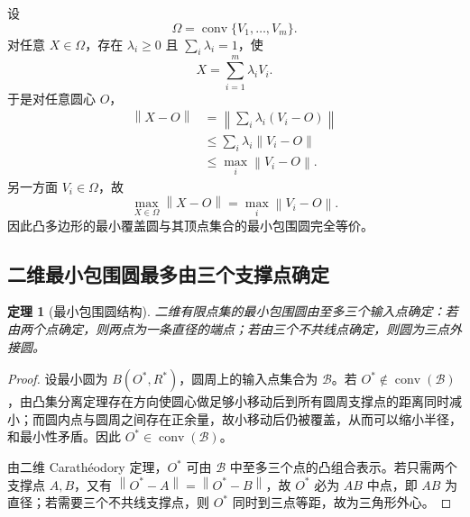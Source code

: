 \documentclass[UTF8,12pt,a4paper]{ctexart}
\newtheorem{theorem}{定理}[section]
\theoremstyle{definition}
\newcommand{\norm}[1]{\left\lVert #1\right\rVert}
\DeclareMathOperator{\conv}{conv}
\begin{document}
设
\begin{equation}
\Omega=\conv\{V_1,\ldots,V_m\}.
\end{equation}
对任意 $X\in\Omega$，存在 $\lambda_i\ge0$ 且 $\sum_i\lambda_i=1$，使
\[
X=\sum_{i=1}^{m}\lambda_iV_i.
\]
于是对任意圆心 $O$，
\begin{align}
\norm{X-O}
&=\norm{\sum_i\lambda_i(V_i-O)}\\
&\le\sum_i\lambda_i\norm{V_i-O}\\
&\le\max_i\norm{V_i-O}.
\end{align}
另一方面 $V_i\in\Omega$，故
\begin{equation}
\boxed{
\max_{X\in\Omega}\norm{X-O}
=
\max_i\norm{V_i-O}.
}
\label{eq:polygon-vertex-mec}
\end{equation}
因此凸多边形的最小覆盖圆与其顶点集合的最小包围圆完全等价。

\subsection{二维最小包围圆最多由三个支撑点确定}

\begin{theorem}[最小包围圆结构]
二维有限点集的最小包围圆由至多三个输入点确定：若由两个点确定，则两点为一条直径的端点；若由三个不共线点确定，则圆为三点外接圆。
\label{thm:mec-support}
\end{theorem}
\begin{proof}
设最小圆为 $B(O^*,R^*)$，圆周上的输入点集合为 $\mathcal B$。若 $O^*\notin\conv(\mathcal B)$，由凸集分离定理存在方向使圆心做足够小移动后到所有圆周支撑点的距离同时减小；而圆内点与圆周之间存在正余量，故小移动后仍被覆盖，从而可以缩小半径，和最小性矛盾。因此 $O^*\in\conv(\mathcal B)$。

由二维 Carath\'eodory 定理，$O^*$ 可由 $\mathcal B$ 中至多三个点的凸组合表示。若只需两个支撑点 $A,B$，又有 $\norm{O^*-A}=\norm{O^*-B}$，故 $O^*$ 必为 $AB$ 中点，即 $AB$ 为直径；若需要三个不共线支撑点，则 $O^*$ 同时到三点等距，故为三角形外心。
\end{proof}
\end{document}
